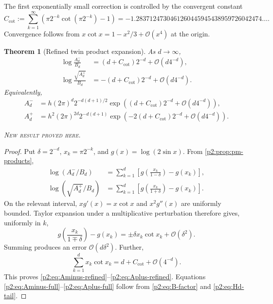 \documentclass[11pt,oneside]{article}
\newtheorem{theorem}{Theorem}[section]
\theoremstyle{definition}
\theoremstyle{remark}
\newcommand{\bigO}{\mathcal O}
\newcommand{\newresult}{\textcolor{newgreen}{\textsc{New result proved here.}}}
\begin{document}
The first exponentially small correction is controlled by the convergent constant
\begin{equation}
 C_{\cot}:=\sum_{k=1}^{\infty}
 \left(\pi2^{-k}\cot(\pi2^{-k})-1\right)
 =-1.2837124730461260445945438959726042474\ldots.
 \label{p2:eq:Ccot}
\end{equation}
Convergence follows from $x\cot x=1-x^2/3+\bigO(x^4)$ at the origin.

\begin{theorem}[Refined twin product expansion]\label{p2:thm:pm-product-asymptotic}
As $d\to\infty$,
\begin{align}
 \log\frac{A_d^-}{B_d}
 &=(d+C_{\cot})2^{-d}+\bigO(d4^{-d}),
 \label{p2:eq:Aminus-refined}\\
 \log\frac{\sqrt{A_d^+}}{B_d}
 &=-(d+C_{\cot})2^{-d}+\bigO(d4^{-d}).
 \label{p2:eq:Aplus-refined}
\end{align}
Equivalently,
\begin{align}
 A_d^-&=h(2\pi)^d2^{-d(d+1)/2}
 \exp\!\left((d+C_{\cot})2^{-d}+\bigO(d4^{-d})\right),
 \label{p2:eq:Aminus-full}\\
 A_d^+&=h^2(2\pi)^{2d}2^{-d(d+1)}
 \exp\!\left(-2(d+C_{\cot})2^{-d}+\bigO(d4^{-d})\right).
 \label{p2:eq:Aplus-full}
\end{align}

\smallskip\noindent\newresult
\end{theorem}

\begin{proof}
Put $\delta=2^{-d}$, $x_k=\pi2^{-k}$, and $g(x)=\log(2\sin x)$. From
\cref{p2:prop:pm-products},
\begin{align*}
 \log(A_d^-/B_d)
 &=\sum_{k=1}^{d}\left[g\!\left(\frac{x_k}{1-\delta}\right)-g(x_k)\right],\\
 \log(\sqrt{A_d^+}/B_d)
 &=\sum_{k=1}^{d}\left[g\!\left(\frac{x_k}{1+\delta}\right)-g(x_k)\right].
\end{align*}
On the relevant interval, $xg'(x)=x\cot x$ and $x^2g''(x)$ are uniformly bounded.
Taylor expansion under a multiplicative perturbation therefore gives, uniformly in
$k$,
\[
 g\!\left(\frac{x_k}{1\mp\delta}\right)-g(x_k)
 =\pm\delta x_k\cot x_k+\bigO(\delta^2).
\]
Summing produces an error $\bigO(d\delta^2)$. Further,
\[
 \sum_{k=1}^{d}x_k\cot x_k
 =d+C_{\cot}+\bigO(4^{-d}).
\]
This proves \eqref{p2:eq:Aminus-refined}--\eqref{p2:eq:Aplus-refined}. Equations
\eqref{p2:eq:Aminus-full}--\eqref{p2:eq:Aplus-full} follow from
\eqref{p2:eq:B-factor} and \eqref{p2:eq:Hd-tail}.
\end{proof}
\end{document}
